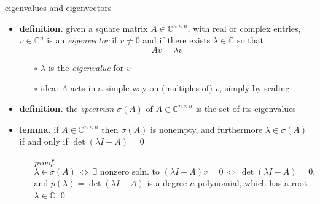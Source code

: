 \documentclass[10pt,hyperref]{beamer}
\newcommand{\CC}{\mathbb{C}}
\newcommand{\bqed}{{\color{blue}\qed}}
\begin{document}
\begin{frame}{eigenvalues and eigenvectors}

\begin{itemize}
\item \textbf{definition.}  given a square matrix $A \in \CC^{n\times n}$, with real or complex entries, $v\in\CC^n$ is an \emph{eigenvector} if $v\ne 0$ and if there exists $\lambda\in \CC$ so that
    $$A v = \lambda v$$

\vspace{-2mm}
    \begin{itemize}
    \item[$\circ$] $\lambda$ is the \emph{eigenvalue} for $v$
    \item[$\circ$] idea: $A$ acts in a simple way on (multiples of) $v$, simply by scaling
    \end{itemize}
\item \textbf{definition.}  the \emph{spectrum} $\sigma(A)$ of $A \in \CC^{n\times n}$ is the set of its eigenvalues
\item \textbf{lemma.} if $A \in \CC^{n\times n}$ then $\sigma(A)$ is nonempty, and furthermore $\lambda\in\sigma(A)$ if and only if $\det(\lambda I - A)=0$
    \begin{itemize}
    \item[\emph{proof.}] 
   $$\lambda\in\sigma(A) \, \iff \, \exists \text{ nonzero soln.~to } (\lambda I - A) v = 0 \, \iff \, \det(\lambda I - A)=0,$$
and $p(\lambda) = \det(\lambda I - A)$ is a degree $n$ polynomial, which has a root $\lambda\in\CC$ \bqed
    \end{itemize}
\end{itemize}
\end{frame}
\end{document}
